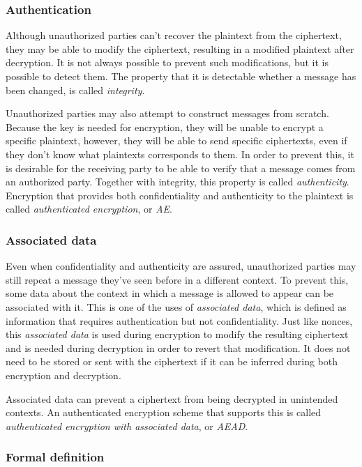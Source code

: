 \subsubsection{Authentication}

Although unauthorized parties can't recover the plaintext from the ciphertext,
they may be able to modify the ciphertext, resulting in a modified plaintext
after decryption. It is not always possible to prevent such modifications, but
it is possible to detect them. The property that it is detectable whether a
message has been changed, is called \emph{integrity}.

Unauthorized parties may also attempt to construct messages from scratch.
Because the key is needed for encryption, they will be unable to encrypt a
specific plaintext, however, they will be able to send specific ciphertexts,
even if they don't know what plaintexts corresponds to them. In order to prevent
this, it is desirable for the receiving party to be able to verify that a
message comes from an authorized party. Together with integrity, this property
is called \emph{authenticity}. Encryption that provides both confidentiality and
authenticity to the plaintext is called \emph{authenticated encryption}, or
\emph{AE}.

\subsubsection{Associated data}

Even when confidentiality and authenticity are assured, unauthorized parties may
still repeat a message they've seen before in a different context. To prevent
this, some data about the context in which a message is allowed to appear can be
associated with it. This is one of the uses of \emph{associated data}, which is
defined as information that requires authentication but not confidentiality.
Just like nonces, this \emph{associated data} is used during encryption to
modify the resulting ciphertext and is needed during decryption in order to
revert that modification. It does not need to be stored or sent with the
ciphertext if it can be inferred during both encryption and decryption.

Associated data can prevent a ciphertext from being decrypted in unintended
contexts. An authenticated encryption scheme that supports this is called
\emph{authenticated encryption with associated data}, or \emph{AEAD}.

\subsubsection{Formal definition}

